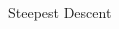 \begin{frame}
\begin{columns}[t]
\begin{column}{0.5\textwidth}
\begin{greenblock}{Steepest Descent}
\begin{algorithm}[H]
        \end{algorithm}

      \end{greenblock}

    \end{column}

  \end{columns}

\end{frame}





